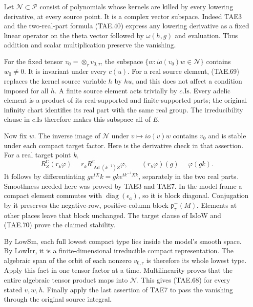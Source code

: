 Let \(\mathcal N\subset\mathcal P\) consist of polynomials
whose kernels are killed by every lowering derivative,
at every source point.  It is a complex vector subspace.
Indeed TAE3 and the two-real-part formula (TAE.40) express
any lowering derivative as a fixed linear operator on
the theta vector followed by \(\omega(h,g)\) and
evaluation.  Thus addition and scalar multiplication
preserve the vanishing.

For the fixed tensor \(v_0=\otimes_\tau v_{0,\tau}\),
the subspace
\(\{w:io(v_0)w\in\mathcal N\}\) contains \(w_0\ne0\).
It is invariant under every \(c(u)\).  For a real source
element, (TAE.69) replaces the kernel source variable
\(h\) by \(hu\), and this does not affect a condition
imposed for all \(h\).  A finite source element acts
trivially by \(c.\mathrm{Is}\).
Every adelic element is a product of its real-supported
and finite-supported parts; the original infinity chart
identifies its real part with the same real group.
The irreducibility clause in \(c.\mathrm{Is}\) therefore
makes this subspace all of \(E\).

Now fix \(w\).  The inverse image of \(\mathcal N\)
under \(v\mapsto io(v)w\) contains \(v_0\) and is stable
under each compact target factor.
Here is the derivative check in that assertion.
For a real target point \(k\),
\[
 R_Z^{\mathbb C}(r_k\varphi)
        =r_k R_{\operatorname{Ad}(k^{-1})Z}^{\mathbb C}\varphi,
       \qquad (r_k\varphi)(g)=\varphi(gk).
 \tag{TAE.70}
\]
It follows by differentiating
\(g e^{tX}k=gk e^{t k^{-1}Xk}\), separately in the
two real parts.  Smoothness needed here was proved
by TAE3 and TAE7.  In the model frame a compact
element commutes with \(\operatorname{diag}(\epsilon_a)\),
so it is block diagonal.  Conjugation by it preserves
the negative-row, positive-column block
\(\mathfrak p^-_\tau(M)\).  Elements at other places
leave that block unchanged.  The target clause of
\(\mathrm{IsIoW}\) and (TAE.70) prove the claimed stability.

By \(\mathrm{LowSm}\), each full lowest compact type lies
inside the model's smooth space.  By \(\mathrm{LowIrr}\),
it is a finite-dimensional irreducible compact
representation.  The algebraic span of the orbit of
each nonzero \(v_{0,\tau}\) is therefore its whole
lowest type.  Apply this fact in one tensor factor
at a time.  Multilinearity proves that the entire
algebraic tensor product maps into \(\mathcal N\).
This gives (TAE.68) for every stated \(v,w,h\).
Finally apply the last assertion of TAE7 to pass
the vanishing through the original source integral.

